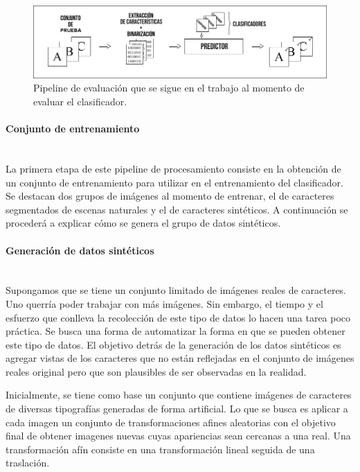 			\begin{figure}[htbp]
				\centering
				\centerline{
					\includegraphics[scale=0.4]{img/pipeline_evaluacion.jpg}
				}
				\caption[Pipeline de evaluación]{Pipeline de evaluación que se sigue en el trabajo al momento de evaluar el clasificador.}
				\label{fig: Pipeline evaluacion}
			\end{figure}
			
		\paragraph{Conjunto de entrenamiento} ~\\
		
			La primera etapa de este pipeline de procesamiento consiste en la obtención de un conjunto de entrenamiento para utilizar en el entrenamiento del clasificador. Se destacan dos grupos de imágenes al momento de entrenar, el de caracteres segmentados de escenas naturales y el de caracteres sintéticos. A continuación se procederá a explicar cómo se genera el grupo de datos sintéticos.
			

		\paragraph{Generación de datos sintéticos} ~\\

			Supongamos que se tiene un conjunto limitado de imágenes reales de caracteres. Uno querría poder trabajar con más imágenes. Sin embargo, el tiempo y el esfuerzo que conlleva la recolección de este tipo de datos lo hacen una tarea poco práctica. Se busca una forma de automatizar la forma en que se pueden obtener este tipo de datos. El objetivo detrás de la generación de los datos sintéticos es agregar vistas de los caracteres que no están reflejadas en el conjunto de imágenes reales original pero que son plausibles de ser observadas en la realidad.
			
			Inicialmente, se tiene como base un conjunto que contiene imágenes de caracteres de diversas tipografías generadas de forma artificial. Lo que se busca es aplicar a cada imagen un conjunto de transformaciones afines aleatorias con el objetivo final de obtener imagenes nuevas cuyas apariencias sean cercanas a una real. Una transformación afín consiste en una transformación lineal seguida de una traslación. 
			
